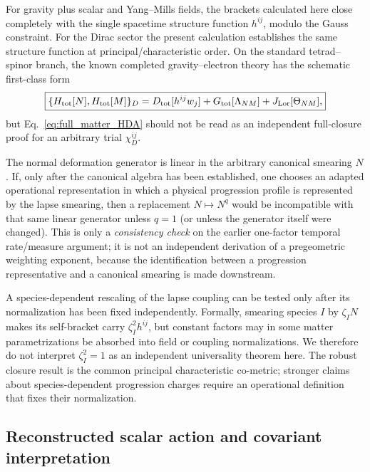 \documentclass[11pt]{article}
\begin{document}
For gravity plus scalar and Yang--Mills fields, the brackets calculated here close completely with the single spacetime structure function $h^{ij}$, modulo the Gauss constraint. For the Dirac sector the present calculation establishes the same structure function at principal/characteristic order. On the standard tetrad--spinor branch, the known completed gravity--electron theory has the schematic first-class form
\begin{equation}
\boxed{
\{H_{\rm tot}[N],H_{\rm tot}[M]\}_D
=D_{\rm tot}[h^{ij}w_j]
+G_{\rm tot}[\Lambda_{NM}]
+J_{\rm Lor}[\Theta_{NM}],}
\label{eq:full_matter_HDA}
\end{equation}
but Eq.~\eqref{eq:full_matter_HDA} should not be read as an independent full-closure proof for an arbitrary trial $\chi_D^{ij}$.

The normal deformation generator is linear in the arbitrary canonical smearing $N$. If, only after the canonical algebra has been established, one chooses an adapted operational representation in which a physical progression profile is represented by the lapse smearing, then a replacement $N\mapsto N^q$ would be incompatible with that same linear generator unless $q=1$ (or unless the generator itself were changed). This is only a \emph{consistency check} on the earlier one-factor temporal rate/measure argument; it is not an independent derivation of a pregeometric weighting exponent, because the identification between a progression representative and a canonical smearing is made downstream.

A species-dependent rescaling of the lapse coupling can be tested only after its normalization has been fixed independently. Formally, smearing species $I$ by $\zeta_I N$ makes its self-bracket carry $\zeta_I^2 h^{ij}$, but constant factors may in some matter parametrizations be absorbed into field or coupling normalizations. We therefore do not interpret $\zeta_I^2=1$ as an independent universality theorem here. The robust closure result is the common principal characteristic co-metric; stronger claims about species-dependent progression charges require an operational definition that fixes their normalization.

\subsection{Reconstructed scalar action and covariant interpretation}
\end{document}
